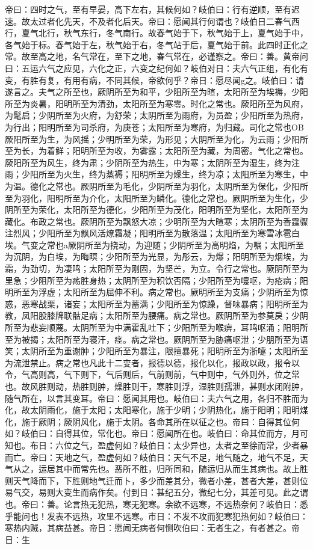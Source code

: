 \documentclass[a4paper,12pt,UTF8,twoside]{ctexbook}
\begin{document}
帝曰：四时之气，至有早晏，高下左右，其候何如？岐伯曰：行有逆顺，至有迟速。故太过者化先天，不及者化后天。帝曰：愿闻其行何谓也？岐伯日二春气西行，夏气北行，秋气东行，冬气南行。故春气始于下，秋气始于上，夏气始于中，各气始于标。春气始于左，秋气始于右，冬气站于后，夏气始于前。此四时正化之常。故至高之地，名气常在，至下之地，春气常在，必谨察之。帝曰：善。黄帝问曰：五运六气之应见，六化之正，六变之纪何如？岐伯对日：夫六气正组，有化有变，有胜有复，有用有病，不同其候，帝欲何乎？帝日：愿尽闻g之。岐伯曰：请遂言之。夫气之所至也，厥阴所至为和平，少阻所至为暄，太阳所至为埃褥，少阳所至为炎暑，阳明所至为清劲，太阳所至为寒零。时化之常也。厥阳所至为风府，为髦启；少阴所至为火府，为舒荣；太阴所至为雨府，为员盈；少阳所至为热府，为行出；阳明所至为司杀府，为庚苍；太阳所至为寒府，为归藏。司化之常也OB厥阳所至为生，为风摇；少明所至为荣，为形见；大阴所至为化，为云雨；少阳所至为长，为着鲜；阳明所至为收，为雾露；太阳所至为藏，为周密。气化之常也。厥阳所至为风生，终为肃；少阴所至为热生，中为寒；太阴所至为湿生，终为注雨；少阳所至为火生，终为蒸褥；阳明所至为燥生，终为凉；太阳所至为寒生，中为温。德化之常也。厥阴所至为毛化，少阴所至为羽化，太阴所至为保化，少阳所至为羽化，阳明所至为介化，太阳所至为鳞化。德化之常也。厥阴所至为生化，少阴所至为荣化，太阳所至为德化，少阳所至为茂化，阳明所至为坚化，太阳所至为藏化。布政之常也。厥阴所至为飘怒大凉；少明所至为大暄寒；太阴所至为香霆骤注烈风；少阳所至为飘风活燎霜凝；阳明所至为散落温；太阳所至为寒雪冰雹白埃。气变之常也a厥阴所至为挠动，为迎随；少阴所至为高明焰，为嘱；太阳所至为沉阴，为白埃，为晦瞑；少阳所至为光显，为彤云，为爆；阳明所至为烟埃，为霜，为劲切，为凄鸣；太阳所至为刚固，为坚芒，为立。令行之常也。厥阴所至为里急；少阻所至为疡胜身热；太阴所至为积饮否隔；少阳所至为嚏呕，为疮病；阳明所至为浮虚；太阳所至为屈伸不利。病之常也。厥明所至为支痛；少阴所至为惊惑，恶寒战栗，诸妄；太阳所至为蓄满；少阳所至为惊躁，督味暴病；阳明所至为教，凤阳股膝牌联骷足病；太阳所至为腰痛。病之常也。厥阴所至为参莫戾；少阴所至为悲妄顺蔑。太阴所至为中满霍乱吐下；少阳所至为喉痹，耳鸣呕涌；阳明所至为被揭；太阳所至为寝汗，痉。病之常也。厥阴所至为胁痛呕泄；少朋所至为语笑；太阴所至为重谢肿；少阳所至为暴注，限擅暴死；阳明所至为浙嚏；太阳所至为流泄禁止。病之常也凡此十二变者，报德以德，报化以化，报政以政，报令以令，气高则高，气下则下，气后则后，气前则前，气中则中，气外则外，位之常也。故风胜则动，热胜则肿，燥胜则干，寒胜则浮，湿胜则孺泄，甚则水闭附肿，随气所在，以言其变耳。帝曰：愿闻其用也。岐伯曰：夫六气之用，各归不胜而为化，故太阴雨化，施于太阳；太阳寒化，施于少明；少阴热化，施于阳明；阳明煤化，施于厥阴；厥阴风化，施于太阴。各命其所在以征之也。帝曰：自得其位何如？岐伯曰：自得其位，常化也。帝曰：愿闻所在也。岐伯曰：命其位而方，月可知也。布日：六位之气，盈虚何如？岐伯日：太少异也，太者之至徐而常，少者暴而亡。帝曰：天地之气，盈虚何如？岐伯日：天气不足，地气随之，地气不足，天气从之，运居其中而常先也。恶所不胜，归所同和，随运归从而生其病也。故上胜则天气降而下，下胜则地气迁而卜，多少而差其分，微者小差，甚者大差，甚则位易气交，易则大变生而病作矣。付到日：甚纪五分，微纪七分，其差可见。此之谓也。帝曰：善。论言热无犯热，寒无犯寒。余欲不远寒，不远热奈何？岐伯日：悉乎能问也！发表不远热，攻里不远寒。市日：不发不攻而犯寒犯热何如？岐伯曰：寒热内贼，其病益甚。帝日：愿闻无病者何恻吹伯曰：无者生之，有者甚之。帝日：生
\end{document}
